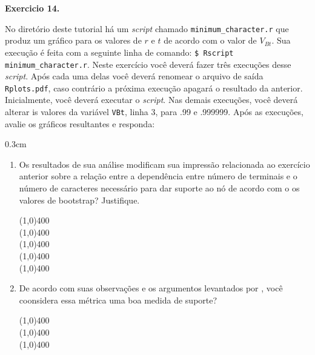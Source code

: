 \begin{refsection}
\begin{blackBlock}{\textbf{Exercicio 14.}}\label{tut14:ex:14.2}

No diretório deste tutorial há um \textit{script} chamado \texttt{minimum\_character.r} que produz um gráfico para os valores de $r$ e $t$ de acordo com o valor de $V_{Bt}$. Sua execução é feita com a seguinte linha de comando: \texttt{\$ Rscript minimum\_character.r}. Neste exercício você deverá fazer três execuções desse \textit{script}. Após cada uma delas você deverá renomear o arquivo de saída \texttt{Rplots.pdf}, caso contrário a próxima execução apagará o resultado da anterior. Inicialmente, você deverá executar o \textit{script}. Nas demais execuções, você deverá alterar is valores da variável \texttt{VBt}, linha 3, para .99 e .999999. Após as execuções, avalie os gráficos resultantes e responda:

\end{blackBlock}


\begin {myindentpar}{0.3cm}
\begin{enumerate}[\itshape i.]

	\item{Os resultados de sua análise modificam sua impressão relacionada ao exercício anterior sobre a relação entre a dependência entre número de terminais e o número de caracteres necessário para dar suporte ao nó de acordo com o os valores de bootstrap? Justifique.}


\begin{center}
\line(1,0){400}\\
\line(1,0){400}\\
\line(1,0){400}\\
\line(1,0){400}\\
\line(1,0){400}\\
\end{center}


	\item{De acordo com suas observações e os argumentos levantados por \textcite{GrantKluge2008b}, você coonsidera essa métrica uma boa medida de suporte?}

\begin{center}
\line(1,0){400}\\
\line(1,0){400}\\
\line(1,0){400}\\
\end{center}

\end{enumerate}
\end{myindentpar}


\end{refsection}
